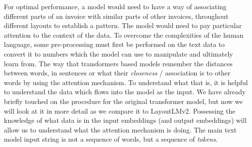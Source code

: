 For optimal performance, a model would need to have a way of associating different parts of an invoice with similar parts of other invoices,
throughout different layouts to establish a pattern. The model would need to pay particular attention to the context of the data.
\bigbreak
To overcome the complexities of the human language, some pre-processing must first be performed on the text data to convert it to
numbers which the model can use to manipulate and ultimately learn from. The way that transformers based models remember the
distances between words, in sentences or what their \emph{closeness} / association is to other words by using the attention mechanism.
\bigbreak
To understand what that is, it is helpful to understand the data which flows into the model as the input. We have already
briefly touched on the  procedure for the original transformer model, but now we will look at it in more detail
as we compare it to LayoutLMv2. Possessing the knowledge of what data is in the input embeddings (and output embeddings) will allow us to
understand what the attention mechanism is doing.
\bigbreak
The main text model input string is not a sequence of words, but a sequence of \emph{tokens}.
